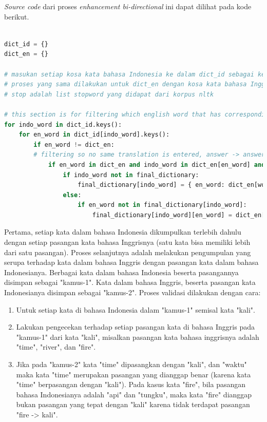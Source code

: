 \textit{Source code} dari proses \textit{enhancement bi-directional} ini dapat dilihat pada kode berikut.

\begin{lstlisting}[language=Python, caption={Word Alignment Enhancement}, label={word-alignment-enhancement}]

dict_id = {}
dict_en = {}

# masukan setiap kosa kata bahasa Indonesia ke dalam dict_id sebagai key dan kumpulan pasangan kata bahasa inggrisnya sebagai value
# proses yang sama dilakukan untuk dict_en dengan kosa kata bahasa Inggris sebagai key dan kumpulan pasangan kata bahasa Indonesia sebagai value
# stop adalah list stopword yang didapat dari korpus nltk

# this section is for filtering which english word that has corresponding indo translation (bidirectional) from Giza output
for indo_word in dict_id.keys():
	for en_word in dict_id[indo_word].keys():
		if en_word != dict_en:
		# filtering so no same translation is entered, answer -> answer, jawaban -> jawaban
			if en_word in dict_en and indo_word in dict_en[en_word] and en_word not in stop:
				if indo_word not in final_dictionary:
					final_dictionary[indo_word] = { en_word: dict_en[word_en][word_id] }
				else:
					if en_word not in final_dictionary[indo_word]:
						final_dictionary[indo_word][en_word] = dict_en[word_en][word_id]
\end{lstlisting}

Pertama, setiap kata dalam bahasa Indonesia dikumpulkan terlebih dahulu dengan setiap pasangan kata bahasa Inggrisnya (satu kata bisa memiliki lebih dari satu pasangan). Proses selanjutnya adalah melakukan pengumpulan yang serupa terhadap kata dalam bahasa Inggris dengan pasangan kata dalam bahasa Indonesianya. Berbagai kata dalam bahasa Indonesia beserta pasangannya disimpan sebagai "kamus-1". Kata dalam bahasa Inggris, beserta pasangan kata Indonesianya disimpan sebagai "kamus-2". Proses validasi dilakukan dengan cara:

\begin{enumerate}
	\item Untuk setiap kata di bahasa Indonesia dalam "kamus-1" semisal kata "kali".
	\item Lakukan pengecekan terhadap setiap pasangan kata di bahasa Inggris pada "kamus-1" dari kata "kali", misalkan pasangan kata bahasa inggrisnya adalah "time", "river", dan "fire".
	\item Jika pada "kamus-2" kata "time" dipasangkan dengan "kali", dan "waktu" maka kata "time" merupakan pasangan yang dianggap benar (karena kata "time" berpasangan dengan "kali"). Pada kasus kata "fire", bila pasangan bahasa Indonesianya adalah "api" dan "tungku", maka kata "fire" dianggap bukan pasangan yang tepat dengan "kali" karena tidak terdapat pasangan "fire -> kali".
\end{enumerate} 


